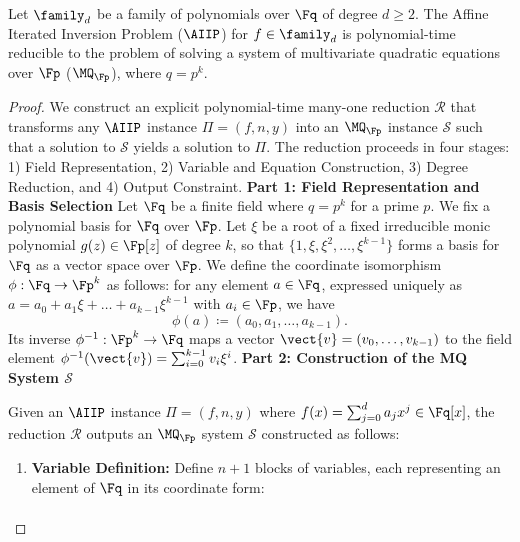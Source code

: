 \begin{theorem}\label{thm:aiip-mq-main}
            Let $\family_d$ be a family of polynomials over $\Fq$ of degree $d \geq 2$. The Affine Iterated Inversion Problem ($\AIIP$) for $f \in \family_d$ is polynomial-time reducible to the problem of solving a system of multivariate quadratic equations over $\Fp$ ($\MQ_{\Fp}$), where $q = p^k$.
        \end{theorem}
        \begin{proof}
            We construct an explicit polynomial-time many-one reduction $\mathcal{R}$ that transforms any $\AIIP$ instance $\Pi = (f, n, y)$ into an $\MQ_{\Fp}$ instance $\mathcal{S}$ such that a solution to $\mathcal{S}$ yields a solution to $\Pi$. The reduction proceeds in four stages: 1) Field Representation, 2) Variable and Equation Construction, 3) Degree Reduction, and 4) Output Constraint.
            \textbf{Part 1: Field Representation and Basis Selection}
                Let $\Fq$ be a finite field where $q = p^k$ for a prime $p$. We fix a polynomial basis for $\Fq$ over $\Fp$. Let $\xi$ be a root of a fixed irreducible monic polynomial $g(z) \in \Fp[z]$ of degree $k$, so that $\{1, \xi, \xi^2, \ldots, \xi^{k-1}\}$ forms a basis for $\Fq$ as a vector space over $\Fp$. We define the coordinate isomorphism $\phi: \Fq \to \Fp^k$ as follows: for any element $a \in \Fq$, expressed uniquely as $a = a_0 + a_1\xi + \ldots + a_{k-1}\xi^{k-1}$ with $a_i \in \Fp$, we have
                \begin{equation}
                    \phi(a) \coloneqq (a_0, a_1, \ldots, a_{k-1}).
                \end{equation}
                Its inverse $\phi^{-1}: \Fp^k \to \Fq$ maps a vector $\vect{v} = (v_0, \ldots, v_{k-1})$ to the field element $\phi^{-1}(\vect{v}) = \sum_{i=0}^{k-1} v_i \xi^i$.
            \textbf{Part 2: Construction of the MQ System $\mathcal{S}$}
                \begin{definition}
                    Given an $\AIIP$ instance $\Pi = (f, n, y)$ where $f(x) = \sum_{j=0}^{d} a_j x^j \in \Fq[x]$, the reduction $\mathcal{R}$ outputs an $\MQ_{\Fp}$ system $\mathcal{S}$ constructed as follows:
                    \begin{enumerate}
                        \item \textbf{Variable Definition:} Define $n+1$ blocks of variables, each representing an element of $\Fq$ in its coordinate form:
                        \begin{align*}

\end{align*}
\end{enumerate}
\end{definition}
\end{proof}
